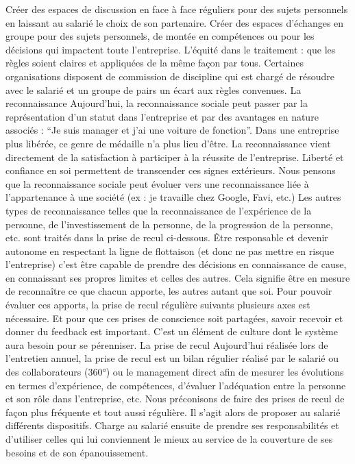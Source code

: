 \documentclass[12pt]{article}
\begin{document}
 Créer des espaces de discussion en face à face réguliers pour des sujets personnels en laissant au salarié le choix de son partenaire.
 Créer des espaces d’échanges en groupe pour des sujets personnels, de montée en compétences ou pour les décisions qui impactent toute l’entreprise.
 L’équité dans le traitement : que les règles soient claires et appliquées de la même façon par tous. Certaines organisations disposent de commission de discipline qui est chargé de résoudre avec le salarié et un groupe de pairs un écart aux règles convenues.
 La reconnaissance
 Aujourd’hui, la reconnaissance sociale peut passer par la représentation d’un statut dans l’entreprise et par des avantages en nature associés : “Je suis manager et j’ai une voiture de fonction”. 
 Dans une entreprise plus libérée, ce genre de médaille n’a plus lieu d’être. La reconnaissance vient directement de la satisfaction à participer à la réussite de l’entreprise. Liberté et confiance en soi permettent de transcender ces signes extérieurs. 
 Nous pensons que la reconnaissance sociale peut évoluer vers une reconnaissance liée à l’appartenance à une société  (ex : je travaille chez Google, Favi, etc.)
 Les autres types de reconnaissance telles que la reconnaissance de l’expérience de la personne, de l’investissement de la personne, de la progression de la personne, etc. sont traités dans la prise de recul ci-dessous. 
 Être responsable et devenir autonome en respectant la ligne de flottaison (et donc ne pas mettre en risque l’entreprise) c’est être capable de prendre des décisions en connaissance de cause, en connaissant ses propres limites et celles des autres. Cela signifie être en mesure de reconnaître ce que chacun apporte, les autres autant que soi. Pour pouvoir évaluer ces apports, la prise de recul régulière suivants plusieurs axes est nécessaire. Et pour que ces prises de conscience soit partagées, savoir recevoir et donner du feedback est important. C’est un élément de culture dont le système aura besoin pour se pérenniser.
 La prise de recul
 Aujourd’hui réalisée lors de l’entretien annuel, la prise de recul est un bilan régulier réalisé par le salarié ou des collaborateurs (360°) ou le management direct afin de mesurer les évolutions en termes d’expérience, de compétences, d’évaluer l’adéquation entre la personne et son rôle dans l’entreprise, etc.
 Nous préconisons de faire des prises de recul de façon plus fréquente et tout aussi régulière. Il s’agit alors de proposer au salarié différents dispositifs. Charge au salarié ensuite de prendre ses responsabilités et d’utiliser celles qui lui conviennent le mieux au service de la couverture de ses besoins et de son épanouissement. 
\end{document}
